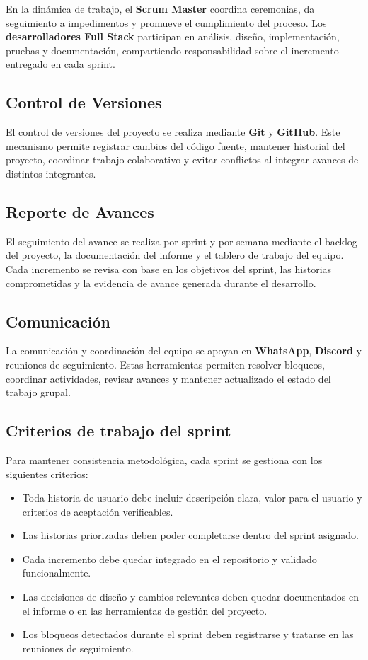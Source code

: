 En la dinámica de trabajo, el \textbf{Scrum Master} coordina ceremonias, da seguimiento a impedimentos y promueve el cumplimiento del proceso. Los \textbf{desarrolladores Full Stack} participan en análisis, diseño, implementación, pruebas y documentación, compartiendo responsabilidad sobre el incremento entregado en cada sprint.

\subsection{Control de Versiones}

El control de versiones del proyecto se realiza mediante \textbf{Git} y \textbf{GitHub}. Este mecanismo permite registrar cambios del código fuente, mantener historial del proyecto, coordinar trabajo colaborativo y evitar conflictos al integrar avances de distintos integrantes.

\subsection{Reporte de Avances}

El seguimiento del avance se realiza por sprint y por semana mediante el backlog del proyecto, la documentación del informe y el tablero de trabajo del equipo. Cada incremento se revisa con base en los objetivos del sprint, las historias comprometidas y la evidencia de avance generada durante el desarrollo.

\subsection{Comunicación}

La comunicación y coordinación del equipo se apoyan en \textbf{WhatsApp}, \textbf{Discord} y reuniones de seguimiento. Estas herramientas permiten resolver bloqueos, coordinar actividades, revisar avances y mantener actualizado el estado del trabajo grupal.

\subsection{Criterios de trabajo del sprint}

Para mantener consistencia metodológica, cada sprint se gestiona con los siguientes criterios:

\begin{itemize}
\item Toda historia de usuario debe incluir descripción clara, valor para el usuario y criterios de aceptación verificables.
\item Las historias priorizadas deben poder completarse dentro del sprint asignado.
\item Cada incremento debe quedar integrado en el repositorio y validado funcionalmente.
\item Las decisiones de diseño y cambios relevantes deben quedar documentados en el informe o en las herramientas de gestión del proyecto.
\item Los bloqueos detectados durante el sprint deben registrarse y tratarse en las reuniones de seguimiento.
\end{itemize}

